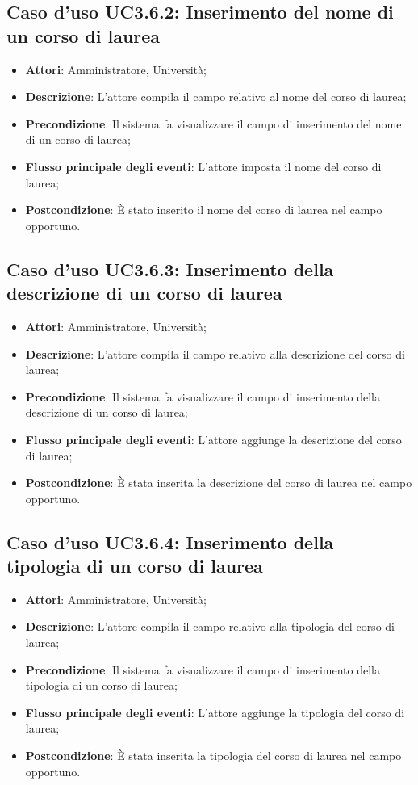 \subsection{Caso d'uso \texorpdfstring{UC3.6.2}{UC3.6.2}: Inserimento del nome di un corso di laurea}
\begin{itemize}
\item \textbf{Attori}: Amministratore, Università;
\item \textbf{Descrizione}: L'attore compila il campo relativo al nome del corso di laurea;
\item \textbf{Precondizione}: Il sistema fa visualizzare il campo di inserimento del nome di un corso di laurea;
\item \textbf{Flusso principale degli eventi}: L'attore imposta il nome del corso di laurea;
\item \textbf{Postcondizione}: È stato inserito il nome del corso di laurea nel campo opportuno.
\end{itemize}
\subsection{Caso d'uso \texorpdfstring{UC3.6.3}{UC3.6.3}: Inserimento della descrizione di un corso di laurea}
\begin{itemize}
\item \textbf{Attori}: Amministratore, Università;
\item \textbf{Descrizione}: L'attore compila il campo relativo alla descrizione del corso di laurea;
\item \textbf{Precondizione}: Il sistema fa visualizzare il campo di inserimento della descrizione di un corso di laurea;

\item \textbf{Flusso principale degli eventi}: L'attore aggiunge la descrizione del corso di laurea;
\item \textbf{Postcondizione}: È stata inserita la descrizione del corso di laurea nel campo opportuno.
\end{itemize}
\subsection{Caso d'uso \texorpdfstring{UC3.6.4}{UC3.6.4}: Inserimento della tipologia di un corso di laurea}
\begin{itemize}
\item \textbf{Attori}: Amministratore, Università;
\item \textbf{Descrizione}: L'attore compila il campo relativo alla tipologia del corso di laurea;
\item \textbf{Precondizione}: Il sistema fa visualizzare il campo di inserimento della tipologia di un corso di laurea;
\item \textbf{Flusso principale degli eventi}: L'attore aggiunge la tipologia del corso di laurea;
\item \textbf{Postcondizione}: È stata inserita la tipologia del corso di laurea nel campo opportuno.
\end{itemize}

